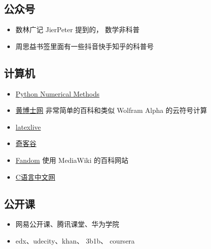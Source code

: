 \subsection{公众号}
\begin{itemize}
\item 数林广记 JierPeter 提到的， 数学非科普
\item 周思益书签里面有一些抖音快手知乎的科普号
\end{itemize}

\subsection{计算机}
\begin{itemize}
\item \href{https://pythonnumericalmethods.berkeley.edu/notebooks/Index.html}{Python Numerical Methods}
\item \href{http://www.drhuang.com/}{黄博士网} 非常简单的百科和类似 Wolfram Alpha 的云符号计算
\item \href{https://www.latexlive.com/}{latexlive}
\item \href{https://www.qikegu.com/}{奇客谷}
\item \href{https://harrypotter.fandom.com/zh/wiki/Special:用户贡献/Laoxie.H}{Fandom} 使用 MediaWiki 的百科网站
\item \href{http://c.biancheng.net/}{C语言中文网}
\end{itemize}

\subsection{公开课}
\begin{itemize}
\item 网易公开课、腾讯课堂、华为学院
\item edx、udecity、khan、 3b1b、 coursera
\end{itemize}
